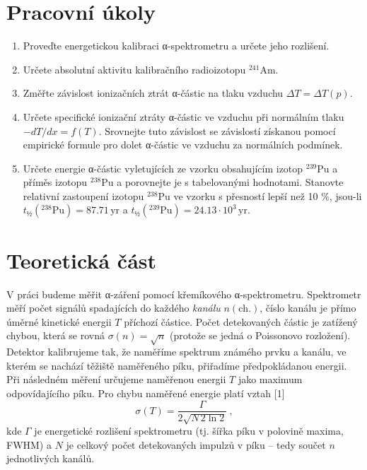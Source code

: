 \documentclass[10pt,a4paper]{article}
\renewcommand{\U}[1]{\ensuremath{\,\mathrm{#1}}}
\newcommand{\°}{\degree}
\begin{document}

\setmainfont{Linux Libertine O}




\section{Pracovní úkoly}
\begin{enumerate}
    \item Proveďte energetickou kalibraci α-spektrometru a určete jeho rozlišení.
    \item Určete absolutní aktivitu kalibračního radioizotopu $^{241}$Am.
    \item Změřte závislost ionizačních ztrát α-částic na tlaku vzduchu $\Delta T = \Delta T(p)$.
    \item Určete specifické ionizační ztráty α-částic ve vzduchu při normálním tlaku $-dT/dx = f(T)$. Srovnejte tuto závislost se závislostí získanou pomocí empirické formule pro dolet α-částic ve vzduchu za normálních podmínek.
    \item Určete energie α-částic vyletujících ze vzorku obsahujícím izotop $^{239}$Pu a příměs izotopu $^{238}$Pu a porovnejte je s tabelovanými hodnotami. Stanovte relativní zastoupení izotopu $^{238}$Pu ve vzorku s přesností lepší než 10 \%, jsou-li $t_½({}^{238}\text{Pu}) = 87.71 \U{yr}$ a $t_½({}^{239}\text{Pu}) = 24.13 \cdot 10^3 \U{yr}$.
\end{enumerate}

\section{Teoretická část}
V práci budeme měřit α-záření pomocí křemíkového α-spektrometru. Spektrometr měří počet signálů spadajících do každého \textit{kanálu} $n(\mathrm{ch.})$, číslo kanálu je přímo úměrné kinetické energii $T$ příchozí částice. Počet detekovaných částic je zatížený chybou, která se rovná $\sigma(n) = \sqrt{n}$ (protože se jedná o Poissonovo rozložení). Detektor kalibrujeme tak, že naměříme spektrum známého prvku a kanálu, ve kterém se nachází těžiště naměřeného píku, přiřadíme předpokládanou energii. Při následném měření určujeme naměřenou energii $T$ jako maximum odpovídajícího píku. Pro chybu naměřené energie platí vztah [1]
\begin{equation}
    \sigma(T) = \frac{\Gamma}{2 \sqrt{N \, 2 \ln 2}} \: ,
    \label{eq-energie-neurcitost}
\end{equation}
kde $\Gamma$ je energetické rozlišení spektrometru (tj. šířka píku v polovině maxima, FWHM) a $N$ je celkový počet detekovaných impulzů v píku – tedy součet $n$ jednotlivých kanálů.
\end{document}
